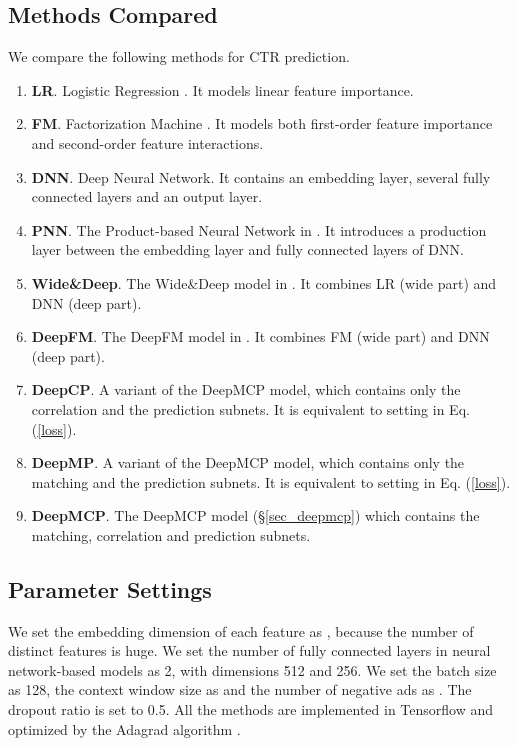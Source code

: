 \documentclass{article}
\begin{document}
\subsection{Methods Compared}
We compare the following methods for CTR prediction.
\begin{enumerate} \item \textbf{LR}. Logistic Regression \cite{richardson2007predicting}. It models linear feature importance.
\item \textbf{FM}. Factorization Machine \cite{rendle2010factorization}. It models both first-order feature importance and second-order feature interactions.
\item \textbf{DNN}. Deep Neural Network. It contains an embedding layer, several fully connected layers and an output layer.
\item \textbf{PNN}. The Product-based Neural Network in \cite{qu2016product}. It introduces a production layer between the embedding layer and fully connected layers of DNN.
\item \textbf{Wide\&Deep}. The Wide\&Deep model in \cite{cheng2016wide}. It combines LR (wide part) and DNN (deep part).
\item \textbf{DeepFM}. The DeepFM model in \cite{guo2017deepfm}. It combines FM (wide part) and DNN (deep part).
\item \textbf{DeepCP}. A variant of the DeepMCP model, which contains only the correlation and the prediction subnets. It is equivalent to setting  in Eq. (\ref{loss}).
\item \textbf{DeepMP}. A variant of the DeepMCP model, which contains only the matching and the prediction subnets. It is equivalent to setting  in Eq. (\ref{loss}).
\item \textbf{DeepMCP}. The DeepMCP model (\S\ref{sec_deepmcp}) which contains the matching, correlation and prediction subnets.
\end{enumerate}

\subsection{Parameter Settings}
We set the embedding dimension of each feature as , because the number of distinct features is huge.
We set the number of fully connected layers in neural network-based models as 2, with dimensions 512 and 256. We set the batch size as 128, the context window size as  and the number of negative ads as .
The dropout ratio is set to 0.5. All the methods are implemented in Tensorflow and optimized by the Adagrad algorithm \cite{duchi2011adaptive}.
\end{document}
